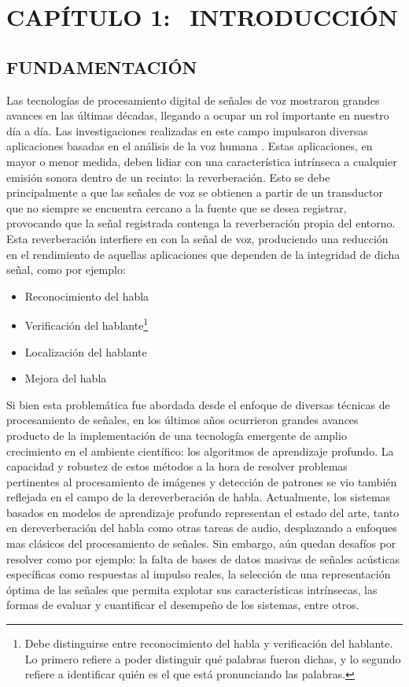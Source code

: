 \section[Introducción]{CAPÍTULO 1:$\ \ \ \ $INTRODUCCIÓN} 

\subsection[Fundamentación]{FUNDAMENTACIÓN}
Las tecnologías de procesamiento digital de señales de voz mostraron grandes avances en las últimas décadas, llegando a ocupar un rol importante en nuestro día a día. Las investigaciones realizadas en este campo impulsaron diversas aplicaciones basadas en el análisis de la voz humana \cite{fun1}\cite{fun2}. 
Estas aplicaciones, en mayor o menor medida, deben lidiar con una característica intrínseca a cualquier emisión sonora dentro de un recinto: la reverberación. Esto se debe principalmente a que las señales de voz se obtienen a partir de un transductor que no siempre se encuentra cercano a la fuente que se desea registrar, provocando que la señal registrada contenga la reverberación propia del entorno. Esta reverberación interfiere en con la señal de voz, produciendo una reducción en el rendimiento de aquellas aplicaciones que dependen de la integridad de dicha señal, como por ejemplo: 

\begin{itemize}
    \item Reconocimiento del habla \cite{reconocimiento}
    \item Verificación del hablante\footnote{Debe distinguirse entre reconocimiento del habla y verificación del hablante. Lo primero refiere a poder distinguir qué palabras fueron dichas, y lo segundo refiere a identificar quién es el que está pronunciando las palabras.} \cite{verificacion}
   
    \item Localización del hablante \cite{localizacion}
    \item Mejora del habla \cite{speech_enhancement}
\end{itemize}


Si bien esta problemática fue abordada desde el enfoque de diversas técnicas de procesamiento de señales, en los últimos años ocurrieron grandes avances producto de la implementación de una tecnología emergente de amplio crecimiento en el ambiente científico: los algoritmos de aprendizaje profundo. La capacidad y robustez de estos métodos a la hora de resolver problemas pertinentes al procesamiento de imágenes y detección de patrones se vio también reflejada en el campo de la dereverberación de habla. Actualmente, los sistemas basados en modelos de aprendizaje profundo representan el estado del arte, tanto en dereverberación del habla como otras tareas de audio, desplazando a enfoques mas clásicos del procesamiento de señales. Sin embargo, aún quedan desafíos por resolver como por ejemplo: la falta de bases de datos masivas de señales acústicas específicas como respuestas al impulso reales, la selección de una representación óptima de las señales que permita explotar sus características intrínsecas, las formas de evaluar y cuantificar el desempeño de los sistemas, entre otros.

